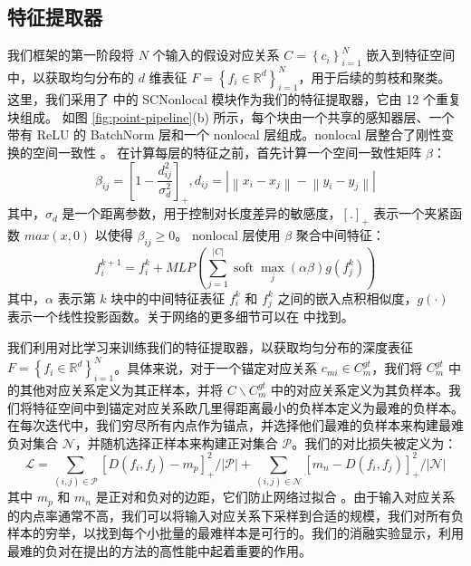 \subsection{特征提取器}\label{sec:feature_extr}
我们框架的第一阶段将 $N$ 个输入的假设对应关系 $C=\left\{c_{i}\right\}_{i=1}^{N}$ 嵌入到特征空间中，以获取均匀分布的 $d$ 维表征 $F=\left\{f_{i} \in \mathbb{R}^{d}\right\}_{i=1}^{N}$，用于后续的剪枝和聚类。
这里，我们采用了 \cite{bai2021pointdsc} 中的 SCNonlocal 模块作为我们的特征提取器，它由 12 个重复块组成。
如图 \ref{fig:point-pipeline}(b) 所示，每个块由一个共享的感知器层、一个带有 ReLU 的 BatchNorm 层和一个 nonlocal 层组成。nonlocal 层整合了刚性变换的空间一致性 \cite{leordeanu2005spectral}。
在计算每层的特征之前，首先计算一个空间一致性矩阵 $\beta$：
\begin{equation}
  \beta_{i j}=\left[1-\frac{d_{i j}^{2}}{\sigma_{d}^{2}}\right]_{+}, d_{i j}=\left|\left\|x_{i}-x_{j}\right\|-\left\|y_{i}-y_{j}\right\|\right|
\end{equation}
其中，$\sigma_{d}$ 是一个距离参数，用于控制对长度差异的敏感度，$[.]_+$ 表示一个夹紧函数 $max(x,0)$ 以使得 $\beta_{ij} \geq 0$。
nonlocal 层使用 $\beta$ 聚合中间特征：
\begin{equation}
  f_{i}^{k+1}=f_{i}^{k}+M L P\left(\sum_{j=1}^{|C|} \operatorname{soft} \max _{j}(\alpha \beta) g\left(f_{j}^{k}\right)\right)
\end{equation}
其中，$\alpha$ 表示第 $k$ 块中的中间特征表征 $f_i^k$ 和 $f_j^k$ 之间的嵌入点积相似度，$g(\cdot)$ 表示一个线性投影函数。关于网络的更多细节可以在 \cite{bai2021pointdsc} 中找到。

我们利用对比学习来训练我们的特征提取器，以获取均匀分布的深度表征 $F=\left\{f_{i} \in \mathbb{R}^{d}\right\}_{i=1}^{N}$。具体来说，对于一个锚定对应关系 $c_{m i} \in C_{m}^{g t}$，我们将 $C_m^{gt}$ 中的其他对应关系定义为其正样本，并将 $C \backslash C_{m}^{g t}$ 中的对应关系定义为其负样本。我们将特征空间中到锚定对应关系欧几里得距离最小的负样本定义为最难的负样本。在每次迭代中，我们穷尽所有内点作为锚点，并选择他们最难的负样本来构建最难负对集合 $\mathcal{N}$，并随机选择正样本来构建正对集合 $\mathcal{P}$。我们的对比损失被定义为：
\begin{equation}
  \mathcal{L}=\sum_{(i, j) \in \mathcal{P}}\left[D\left(f_{i}, f_{j}\right)-m_{p}\right]_{+}^{2} /|\mathcal{P}|+\sum_{(i, j) \in \mathcal{N}}\left[m_{n}-D\left(f_{i}, f_{j}\right)\right]_{+}^{2} /|\mathcal{N}|
  \label{loss}
\end{equation}
其中 $m_p$ 和 $m_n$ 是正对和负对的边距，它们防止网络过拟合 \cite{lin2015Deephash}。由于输入对应关系的内点率通常不高，我们可以将输入对应关系下采样到合适的规模，我们对所有负样本的穷举，以找到每个小批量的最难样本是可行的。我们的消融实验显示，利用最难的负对在提出的方法的高性能中起着重要的作用。

